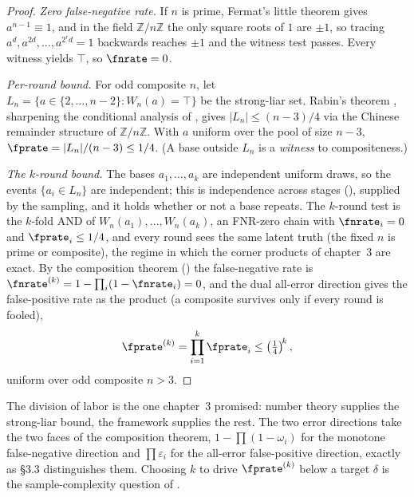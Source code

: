 \begin{proof}
\emph{Zero false-negative rate.} If $n$ is prime, Fermat's little theorem gives
$a^{n-1} \equiv 1$, and in the field $\mathbb{Z}/n\mathbb{Z}$ the only square
roots of $1$ are $\pm 1$, so tracing $a^d, a^{2d}, \ldots, a^{2^r d} = 1$
backwards reaches $\pm 1$ and the witness test passes. Every witness yields
$\top$, so $\fnrate = 0$.

\emph{Per-round bound.} For odd composite $n$, let $L_n = \{a \in \{2, \ldots,
n-2\} : W_n(a) = \top\}$ be the strong-liar set. Rabin's theorem
\parencite{rabin-1980}, sharpening the conditional analysis of
\textcite{miller-1976}, gives $|L_n| \le (n-3)/4$ via the Chinese remainder
structure of $\mathbb{Z}/n\mathbb{Z}$. With $a$ uniform over the pool of size
$n - 3$, $\fprate = |L_n|/(n-3) \le 1/4$. (A base outside $L_n$ is a
\emph{witness} to compositeness.)

\emph{The $k$-round bound.} The bases $a_1, \ldots, a_k$ are independent uniform
draws, so the events $\{a_i \in L_n\}$ are independent; this is independence
across stages
(), supplied by the sampling, and it holds
whether or not a base repeats. The $k$-round test is the $k$-fold AND of
$W_n(a_1), \ldots, W_n(a_k)$, an FNR-zero chain with $\fnrate_i = 0$ and
$\fprate_i \le 1/4$, and every round sees the same latent truth (the fixed $n$
is prime or composite), the regime in which the corner products of chapter~3
are exact. By the composition theorem () the
false-negative rate is $\fnrate^{(k)} = 1 - \prod_i(1 - \fnrate_i) = 0$, and the
dual all-error direction gives the false-positive rate as the product (a
composite survives only if every round is fooled),
\[
  \fprate^{(k)} = \prod_{i=1}^{k} \fprate_i \le \left(\tfrac14\right)^{\!k},
\]
uniform over odd composite $n > 3$.
\end{proof}

The division of labor is the one chapter~3 promised: number theory supplies the
strong-liar bound, the framework supplies the rest. The two error directions
take the two faces of the composition theorem, $1 - \prod(1 - \omega_i)$ for the
monotone false-negative direction and $\prod \varepsilon_i$ for the all-error
false-positive direction, exactly as \S3.3 distinguishes them. Choosing $k$ to
drive $\fprate^{(k)}$ below a target $\delta$ is the sample-complexity question
of .
